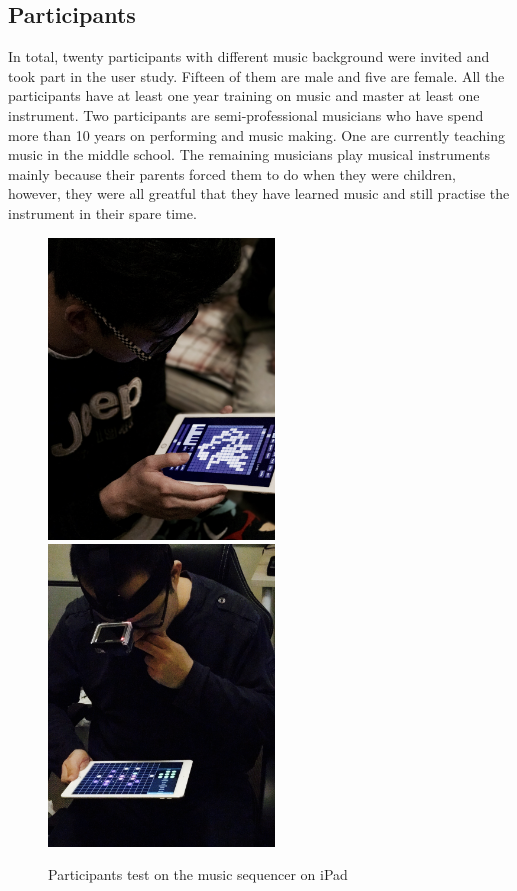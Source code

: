 \subsection{Participants}

In total, twenty participants with different music background were invited and took part in the user study. Fifteen of them are male and five are female. All the participants have at least one year training on music and master at least one instrument. Two participants are semi-professional musicians who have spend more than 10 years on performing and music making. One are currently teaching music in the middle school. The remaining musicians play musical instruments mainly because their parents forced them to do when they were children, however, they were all greatful that they have learned music and still practise the instrument in their spare time.

\bigskip
\begin{figure}[h]
  \includegraphics[width=6cm]{images/Participant}
  \includegraphics[width=6cm]{images/Participant2}
  \centering
  \caption{Participants test on the music sequencer on iPad}
  \label{fig: participant}
\end{figure}
\bigskip


